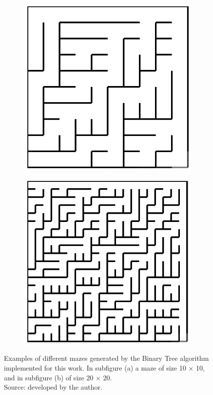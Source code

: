 \begin{figure}[!h]
	\centering
	\begin{subfigure}{.45\textwidth}
	  \centering
	  \includegraphics[width=.6\linewidth]{binary1010}
	  \caption{}
	  \label{fig:sub1}
	\end{subfigure}
	\begin{subfigure}{.45\textwidth}
	  \centering
	  \includegraphics[width=.6\linewidth]{binary2020}
	  \caption{}
	  \label{fig:sub2}
	\end{subfigure}
	\caption{Examples of different mazes generated by the Binary Tree algorithm implemented for this work. In subfigure (a) a maze of size 10 $\times$ 10, and in subfigure (b) of size 20 $\times$ 20.\\Source: developed by the author.}
	\label{fig:test}
	\end{figure}
\newline
\\
\\
\\
\newpage
